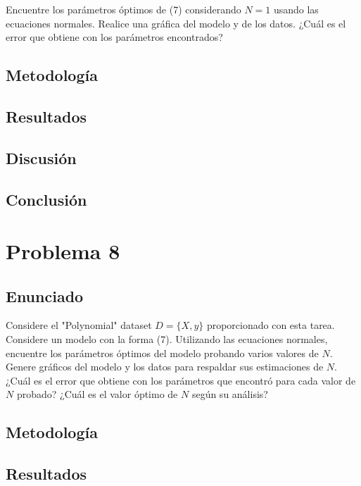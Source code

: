 \documentclass{article}
\begin{document}
Encuentre los parámetros óptimos de (7) considerando $N=1$ usando las ecuaciones normales. Realice una gráfica del modelo y de los datos. ¿Cuál es el error que obtiene con los parámetros encontrados?

\subsection{Metodología}

\subsection{Resultados}
\setcounter{equation}{0}

\subsection{Discusión}

\subsection{Conclusión}

\section{Problema 8}

\subsection{Enunciado}

Considere el "Polynomial" dataset $D = \{X,y\}$ proporcionado con esta tarea. Considere un modelo con la forma (7). Utilizando las ecuaciones normales, encuentre los parámetros óptimos del modelo probando varios valores de $N$. Genere gráficos del modelo y los datos para respaldar sus estimaciones de $N$. ¿Cuál es el error que obtiene con los parámetros que encontró para cada valor de $N$ probado? ¿Cuál es el valor óptimo de $N$ según su análisis?

\subsection{Metodología}

\subsection{Resultados}
\setcounter{equation}{0}
\end{document}
